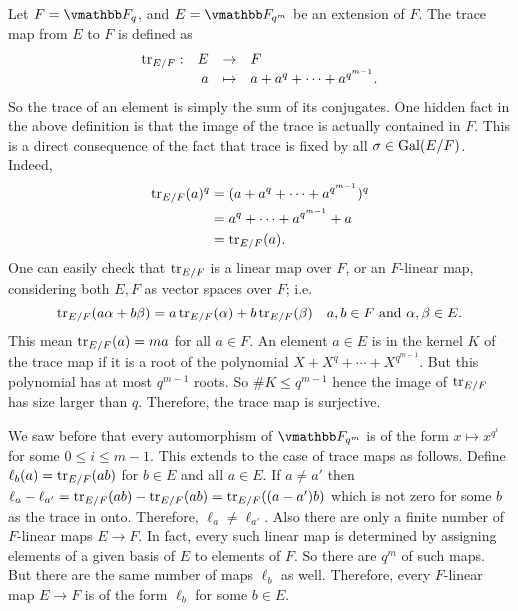Let $F = \F_q$, and $E = \F_{q^m}$ be an extension of $F$. The trace map from $E$ to $F$ is defined 
as
\[
	\begin{array}{lrll}
		\operatorname{tr}_{E/F}: & E & \rightarrow & F \\
		& a & \mapsto & a + a^q + \cdots + a^{q^{m - 1}}.
	\end{array}
\]
So the trace of an element is simply the sum of its conjugates. One hidden fact in the above 
definition is that the image of the trace is actually contained in $F$. This is a direct 
consequence of the fact that trace is fixed by all $\sigma \in \operatorname{Gal}(E/F)$. Indeed, 
\begin{align*}
	\operatorname{tr}_{E/F}(a)^q &= (a + a^q + \cdots + a^{q^{m - 1}})^q \\
	& = a^q + \cdots + a^{q^{m - 1}} + a \\
	& = \operatorname{tr}_{E/F}(a). 
\end{align*}
One can easily check that $\operatorname{tr}_{E/F}$ is a linear map over $F$, or an $F$-linear map, 
considering both $E, F$ as vector spaces over $F$; i.e. 
\[ \operatorname{tr}_{E/F}(a\alpha + b\beta) = a\operatorname{tr}_{E/F}(\alpha) + b\operatorname{tr}_{E/F}(\beta) \quad a, b \in F 
\text{ and } \alpha, \beta \in E. \]
This mean $\operatorname{tr}_{E/F}(a) = ma$ for all $a \in F$. An element $a \in E$ is in the kernel $K$ of 
the trace map if it is a root of the polynomial $X + X^q + \cdots + X^{q^{m - 1}}$. But this 
polynomial has at most $q^{m - 1}$ roots. So $\#K \le q^{m - 1}$ hence the image of $\operatorname{tr}_{E/F}$ 
has size larger than $q$. Therefore, the trace map is surjective.

We saw before that every automorphism of $\F_{q^m}$ is of the form $x \mapsto x^{q^i}$ for some $0 
\le i \le m - 1$. This extends to the case of trace maps as follows. Define $\ell_b(a) = 
\operatorname{tr}_{E/F}(ab)$ for $b \in E$ and all $a \in E$. If $a \ne a'$ then $\ell_a - \ell_{a'} = 
\operatorname{tr}_{E/F}(ab) - \operatorname{tr}_{E/F}(ab) = \operatorname{tr}_{E/F}((a - a')b)$ which is not zero for some $b$ as 
the trace in onto. Therefore, $\ell_a \ne \ell_{a'}$. Also there are only a finite number of 
$F$-linear maps $E \rightarrow F$. In fact, every such linear map is determined by assigning 
elements of a given basis of $E$ to elements of $F$. So there are $q^m$ of such maps. But there are 
the same number of maps $\ell_b$ as well. Therefore, every $F$-linear map $E \rightarrow F$ is of 
the form $\ell_b$ for some $b \in E$.

